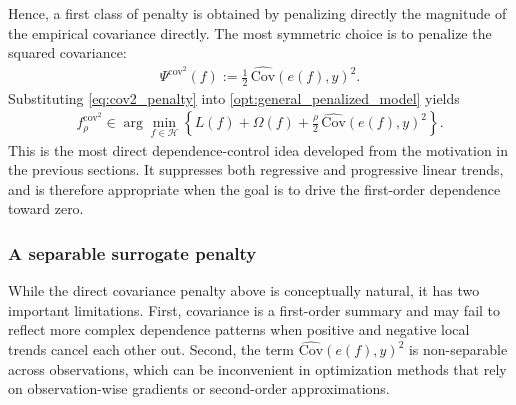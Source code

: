 \documentclass[12pt, draft]{article}
\theoremstyle{plain}
\theoremstyle{definition}
\newcommand{\1}{\mathbf{1}}
\newcommand{\Cov}{\text{Cov}}
\renewcommand{\H}{\mathcal{H}}
\begin{document}
Hence, a first class of penalty is obtained by penalizing directly the magnitude of the empirical covariance directly. The most symmetric choice is to penalize the squared covariance:
\begin{align}
    \label{eq:cov2_penalty}
    \Psi^{\mathrm{cov}^2}(f)
    :=
    \frac{1}{2}\,
    \widehat{\Cov}(e(f),y)^2.
\end{align}
Substituting \eqref{eq:cov2_penalty} into \eqref{opt:general_penalized_model} yields
\begin{align}
    \label{opt:cov2_penalized_model}
    f_{\rho}^{\mathrm{cov}^2}
    \in
    \arg\min_{f\in\H}
    \left\{
        L(f)+\Omega(f)
        +
        \frac{\rho}{2}\,\widehat{\Cov}(e(f),y)^2
    \right\}.
\end{align}
This is the most direct dependence-control idea developed from the motivation in the previous sections. It suppresses both regressive and progressive linear trends, and is therefore appropriate when the goal is to drive the first-order dependence toward zero. 

\subsubsection{A separable surrogate penalty}

While the direct covariance penalty above is conceptually natural, it has two important limitations. First, covariance is a first-order summary and may fail to reflect more complex dependence patterns when positive and negative local trends cancel each other out. Second, the term $\widehat{\Cov}(e(f),y)^2$ is non-separable across observations, which can be inconvenient in optimization methods that rely on observation-wise gradients or second-order approximations.
\end{document}
